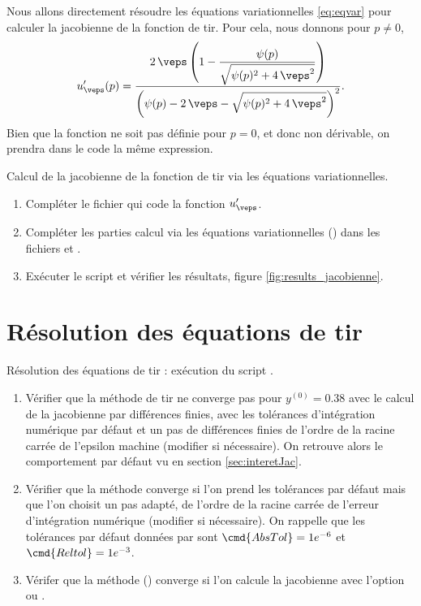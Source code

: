 Nous allons directement r\'esoudre les \'equations variationnelles \eqref{eq:eqvar} pour calculer la jacobienne de la fonction de tir.
Pour cela, nous donnons pour $p\ne0$,
\[
    \displaystyle
    u'_\veps(p) = \frac{ 2\, \veps \left( 1 - \displaystyle\frac{\psi(p)}{\sqrt{\psi(p)^2+4\,\veps^2}} \right) }
    { \left( \psi(p) - 2\, \veps - \sqrt{\psi(p)^2+4\,\veps^2} \right)^2 }.
\]
Bien que la fonction ne soit pas d\'efinie pour $p=0$, et donc non d\'erivable, on prendra dans le code la m\^eme expression.
\begin{myExercice} Calcul de la jacobienne de la fonction de tir via les \'equations variationnelles.
    \begin{enumerate}
        \item Compl\'eter le fichier  qui code la fonction $u'_\veps$.
        \item Compl\'eter les parties calcul via les \'equations variationnelles () dans les fichiers  et .
        \item Ex\'ecuter le script  et v\'erifier les r\'esultats, \cf figure \ref{fig:results_jacobienne}.
    \end{enumerate}
\end{myExercice}

\section{R\'esolution des \'equations de tir}

\begin{myExercice} R\'esolution des \'equations de tir : ex\'ecution du script .
    \begin{enumerate}
        \item V\'erifier que la m\'ethode de tir ne converge pas pour $y^{(0)} = 0.38$
            avec le calcul de la jacobienne par diff\'erences finies, avec les tol\'erances
            d'int\'egration num\'erique par d\'efaut et un pas de diff\'erences finies de l'ordre de la racine carr\'ee de 
            l'epsilon machine (modifier  si n\'ecessaire).
            On retrouve alors le comportement par d\'efaut vu en section \ref{sec:interetJac}.
        \item V\'erifier que la m\'ethode converge si l'on prend les tol\'erances par d\'efaut mais que l'on choisit un pas adapt\'e, de l'ordre
             de la racine carr\'ee de l'erreur d'int\'egration num\'erique (modifier  si n\'ecessaire).
             On rappelle que les tol\'erances par d\'efaut donn\'ees par
              sont $\cmd{AbsTol} = 1e^{-6}$ et $\cmd{Reltol} = 1e^{-3}$.
         \item V\'erifer que la m\'ethode () converge si l'on calcule la jacobienne avec l'option  ou .
    \end{enumerate}
\end{myExercice}


